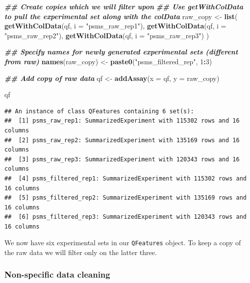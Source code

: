 \documentclass[9pt,a4paper,]{extarticle}
\newenvironment{Shaded}{\begin{snugshade}}{\end{snugshade}}
\newcommand{\AttributeTok}[1]{\textcolor[rgb]{0.13,0.29,0.53}{#1}}
\newcommand{\DecValTok}[1]{\textcolor[rgb]{0.00,0.00,0.81}{#1}}
\newcommand{\DocumentationTok}[1]{\textcolor[rgb]{0.56,0.35,0.01}{\textbf{\textit{#1}}}}
\newcommand{\FunctionTok}[1]{\textcolor[rgb]{0.13,0.29,0.53}{\textbf{#1}}}
\newcommand{\NormalTok}[1]{#1}
\newcommand{\OtherTok}[1]{\textcolor[rgb]{0.56,0.35,0.01}{#1}}
\newcommand{\SpecialCharTok}[1]{\textcolor[rgb]{0.81,0.36,0.00}{\textbf{#1}}}
\newcommand{\StringTok}[1]{\textcolor[rgb]{0.31,0.60,0.02}{#1}}
\begin{document}
\begin{Shaded}
\begin{Highlighting}[]
\DocumentationTok{\#\# Create copies which we will filter upon}
\DocumentationTok{\#\# Use getWithColData to pull the experimental set along with the colData}
\NormalTok{raw\_copy }\OtherTok{\textless{}{-}} \FunctionTok{list}\NormalTok{(}
  \FunctionTok{getWithColData}\NormalTok{(qf, }\AttributeTok{i =} \StringTok{"psms\_raw\_rep1"}\NormalTok{),}
  \FunctionTok{getWithColData}\NormalTok{(qf, }\AttributeTok{i =} \StringTok{"psms\_raw\_rep2"}\NormalTok{),}
  \FunctionTok{getWithColData}\NormalTok{(qf, }\AttributeTok{i =} \StringTok{"psms\_raw\_rep3"}\NormalTok{)}
\NormalTok{)}

\DocumentationTok{\#\# Specify names for newly generated experimental sets (different from raw)}
\FunctionTok{names}\NormalTok{(raw\_copy) }\OtherTok{\textless{}{-}} \FunctionTok{paste0}\NormalTok{(}\StringTok{"psms\_filtered\_rep"}\NormalTok{, }\DecValTok{1}\SpecialCharTok{:}\DecValTok{3}\NormalTok{)}

\DocumentationTok{\#\# Add copy of raw data}
\NormalTok{qf }\OtherTok{\textless{}{-}} \FunctionTok{addAssay}\NormalTok{(}\AttributeTok{x =}\NormalTok{ qf, }
               \AttributeTok{y =}\NormalTok{ raw\_copy)}

\NormalTok{qf}
\end{Highlighting}
\end{Shaded}

\begin{verbatim}
## An instance of class QFeatures containing 6 set(s):
##  [1] psms_raw_rep1: SummarizedExperiment with 115302 rows and 16 columns 
##  [2] psms_raw_rep2: SummarizedExperiment with 135169 rows and 16 columns 
##  [3] psms_raw_rep3: SummarizedExperiment with 120343 rows and 16 columns 
##  [4] psms_filtered_rep1: SummarizedExperiment with 115302 rows and 16 columns 
##  [5] psms_filtered_rep2: SummarizedExperiment with 135169 rows and 16 columns 
##  [6] psms_filtered_rep3: SummarizedExperiment with 120343 rows and 16 columns
\end{verbatim}

We now have six experimental sets in our \texttt{QFeatures} object. To keep a copy
of the raw data we will filter only on the latter three.

\subsubsection{Non-specific data cleaning}\label{non-specific-data-cleaning}
\end{document}
